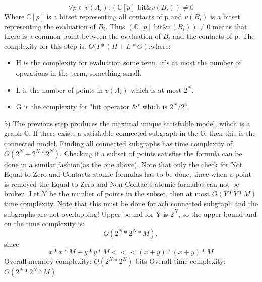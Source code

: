 \documentclass{article}
\begin{document}
			\begin{equation}
				\forall p \in v(A_i): (\mathbb{C}[p] \text{  bit\&  } v(B_i)) \neq 0
			\end{equation}
			Where $\mathbb{C}[p]$ is a bitset representing all contacts of p and 
			$v(B_i)$ is a bitset representing the evaluation of $B_i$.
			\newline
			Thus $(\mathbb{C}[p] \text{  bit\&  } v(B_i)) \neq 0$ means that there is 
			a common point between the evaluation of $B_i$ and the contacts of p.
			\newline
			\newline
			The complexity for this step is: $O(I * (H + L * G)$,where: 
			\begin{itemize}
				\item H is the complexity for evaluation some term, 
					it's at most the number of operations in the term, something small.
				\item L is the number of points in $v(A_i)$ which is at most $2^N$.
			       \item G is the complexity for "bit operator \&" which is $2^N/2^6$.
			\end{itemize}
		5) The previous step produces the maximal unique satisfiable model, wihch is a graph $\mathbb{G}$.
			If there exists a satisfiable connected subgraph in the $\mathbb{G}$, then this is the connected model.
			Finding all connected subgraphs has time complexity of $O(2^N + 2^N * 2^N)$.
			Checking if a subset of points satisfies the formula can be done in a similar fashion(as the one above).
			\newline
			Note that only the check for Not Equal to Zero and Contacts atomic formulas has to be done, 
			since when a point is removed the  Equal to Zero and Non Contacts atomic formulas can not be broken.
			\newline
			Let Y be the number of points in the subset, then at most $O(Y * Y * M)$ time complexity.
			Note that this must be done for ach connected subgraph and the subgraphs are not overlapping!
			Upper bound for Y is $2^N$, so the upper bound and on the time complexity is: 
			\begin{equation*}
				O(2^N * 2^N * M),
			\end{equation*}
			since 
			\begin{equation*}
				x * x * M + y * y * M <<< (x+y)*(x+y)*M
			\end{equation*}
			\newline
			\newline	
		Overall memory complexity: $O(2^N * 2^N)$ bits
		\newline
		Overall time complexity: $O(2^N * 2^N * M)$
\end{document}
